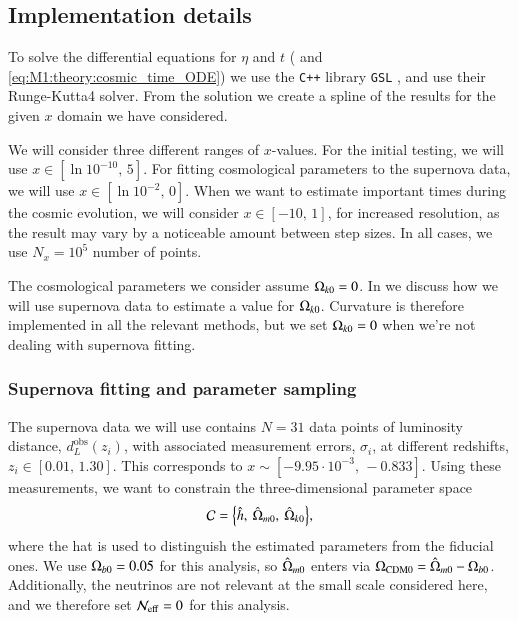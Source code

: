 
\subsection{Implementation details}\label{ssec:M1:implementations} 
To solve the differential equations for $\eta$ and $t$ ( and \eqref{eq:M1:theory:cosmic_time_ODE}) we use the \texttt{C++} library \texttt{GSL} \cite{gough2009gnu}, and use their Runge-Kutta4 solver. From the solution we create a spline of the results for the given $x$ domain we have considered. 

We will consider three different ranges of $x$-values. For the initial testing, we will use $x\in[\ln 10^{-10},\,5]$. For fitting cosmological parameters to the supernova data, we will use $x\in[\ln 10^{-2},\,0]$. When we want to estimate important times during the cosmic evolution, we will consider $x\in[-10,\,1]$, for increased resolution, as the result may vary by a noticeable amount between step sizes. In all cases, we use $N_x=10^5$ number of points.  

The cosmological parameters we consider assume $\Omega_{k0}=0$. In  we discuss how we will use supernova data to estimate a value for $\Omega_{k0}$. Curvature is therefore implemented in all the relevant methods, but we set $\Omega_{k0}=0$ when we're not dealing with supernova fitting.  

\subsubsection{Supernova fitting and parameter sampling}\label{sssec:M1:implementations:supernova_fitting}
The supernova data we will use contains $N=31$ data points of luminosity distance, $d_L^\mathrm{obs}(z_i)$, with associated measurement errors, $\sigma_i$, at different redshifts, $z_i\in[0.01,\,1.30]$. This corresponds to $x\sim[-9.95\cdot 10^{-3},\,-0.833]$. Using these measurements, we want to constrain the three-dimensional parameter space 
\begin{equation}
    \mathcal{C} = \Big\{ \hat{h},\: \hat{\Omega}_{m0},\: \hat{\Omega}_{k0} \Big\}, \label{eq:M1:implementations:supernova_parameter_space}
\end{equation}  
where the hat is used to distinguish the estimated parameters from the fiducial ones. We use $\Omega_{b0}=0.05$ for this analysis, so $\hat{\Omega}_{m0}$ enters via $\Omega_\mathrm{CDM0}=\hat{\Omega}_{m0}-\Omega_{b0}$. Additionally, the neutrinos are not relevant at the small scale considered here, and we therefore set $\mathcal{N}_\mathrm{eff}=0$ for this analysis.  

